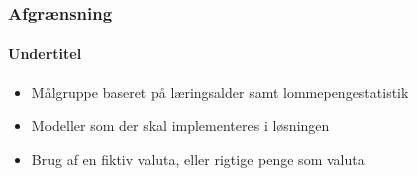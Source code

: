 
\begin{frame}
\frametitle{Afgrænsning}
\framesubtitle{Undertitel} %
    \begin{itemize}
        \item{Målgruppe baseret på læringsalder samt lommepengestatistik}
        \pause
        \item{Modeller som der skal implementeres i løsningen}
        \pause
        \item{Brug af en fiktiv valuta, eller rigtige penge som valuta}
    \end{itemize}
\end{frame}
    
